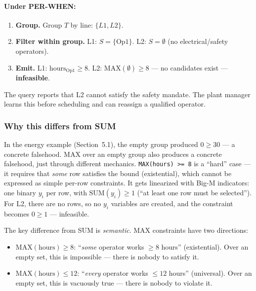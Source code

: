 \documentclass[11pt]{article}
\begin{document}
\paragraph{Under PER-WHEN:}
\begin{enumerate}[leftmargin=2em]
    \item \textbf{Group.} Group $T$ by line: $\{L1, L2\}$.
    \item \textbf{Filter within group.}
        L1: $S = \{\text{Op1}\}$.
        L2: $S = \emptyset$ (no electrical/safety operators).
    \item \textbf{Emit.}
        L1: $\text{hours}_{\text{Op1}} \geq 8$.
        L2: $\text{MAX}(\emptyset) \geq 8$ --- no candidates exist --- \textbf{infeasible}.
\end{enumerate}
The query reports that L2 cannot satisfy the safety mandate. The plant
manager learns this before scheduling and can reassign a qualified operator.

\subsubsection*{Why this differs from SUM}

In the energy example (Section~5.1), the empty group produced $0 \geq 30$
--- a concrete falsehood. MAX over an empty group also produces a concrete
falsehood, just through different mechanics. \texttt{MAX(hours) >= 8} is a ``hard'' case --- it requires that
\emph{some} row satisfies the bound (existential), which cannot be
expressed as simple per-row constraints. It gets linearized with Big-M indicators:
one binary $y_i$ per row, with $\text{SUM}(y_i) \geq 1$ (``at least one
row must be selected''). For L2, there are no rows, so no $y_i$ variables
are created, and the constraint becomes $0 \geq 1$ --- infeasible.

The key difference from SUM is \emph{semantic}. MAX constraints have two
directions:

\begin{itemize}[leftmargin=2em]
    \item $\text{MAX}(\text{hours}) \geq 8$: ``\emph{some} operator works
        $\geq 8$ hours'' (existential). Over an empty set, this is
        impossible --- there is nobody to satisfy it.
    \item $\text{MAX}(\text{hours}) \leq 12$: ``\emph{every} operator works
        $\leq 12$ hours'' (universal). Over an empty set, this is vacuously
        true --- there is nobody to violate it.
\end{itemize}
\end{document}
